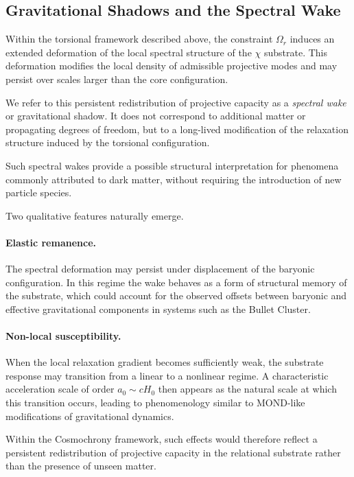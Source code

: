 \subsection{Gravitational Shadows and the Spectral Wake}
  \label{sec:gravitational-shadows}

  Within the torsional framework described above,
  the constraint $\Omega_r$ induces an extended deformation of the
  local spectral structure of the $\chi$ substrate.
  This deformation modifies the local density of admissible projective modes
  and may persist over scales larger than the core configuration.

  We refer to this persistent redistribution of projective capacity as a
  \emph{spectral wake} or gravitational shadow.
  It does not correspond to additional matter or propagating degrees of
  freedom, but to a long-lived modification of the relaxation structure
  induced by the torsional configuration.

  Such spectral wakes provide a possible structural interpretation for
  phenomena commonly attributed to dark matter, without requiring the
  introduction of new particle species.

  Two qualitative features naturally emerge.

  \paragraph*{Elastic remanence.}
    The spectral deformation may persist under displacement of the
    baryonic configuration.
    In this regime the wake behaves as a form of structural memory of the
    substrate, which could account for the observed offsets between
    baryonic and effective gravitational components in systems such as
    the Bullet Cluster.

  \paragraph*{Non-local susceptibility.}
    When the local relaxation gradient becomes sufficiently weak,
    the substrate response may transition from a linear to a nonlinear
    regime.
    A characteristic acceleration scale of order
    \(
    a_0 \sim c H_0
    \)
    then appears as the natural scale at which this transition occurs,
    leading to phenomenology similar to MOND-like modifications of
    gravitational dynamics.

    Within the Cosmochrony framework, such effects would therefore
    reflect a persistent redistribution of projective capacity in the
    relational substrate rather than the presence of unseen matter.
